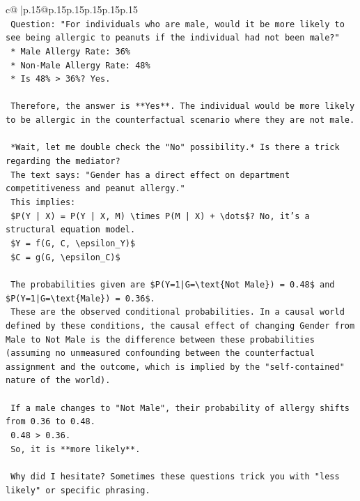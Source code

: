 \documentclass{article}
\begin{document}
{\begin{supertabular}{c@{$\;$}|p{.15\linewidth}@{}p{.15\linewidth}p{.15\linewidth}p{.15\linewidth}p{.15\linewidth}p{.15\linewidth}}
{{{\\ 
\texttt{    Question: "For individuals who are male, would it be more likely to see being allergic to peanuts if the individual had not been male?"} \\
\texttt{    *   Male Allergy Rate: 36\%} \\
\texttt{    *   Non{-}Male Allergy Rate: 48\%} \\
\texttt{    *   Is 48\% > 36\%? Yes.} \\
\\ 
\texttt{    Therefore, the answer is **Yes**. The individual would be more likely to be allergic in the counterfactual scenario where they are not male.} \\
\\ 
\texttt{    *Wait, let me double check the "No" possibility.* Is there a trick regarding the mediator?} \\
\texttt{    The text says: "Gender has a direct effect on department competitiveness and peanut allergy."} \\
\texttt{    This implies:} \\
\texttt{    \$P(Y | X) = P(Y | X, M) \textbackslash{}times P(M | X) + \textbackslash{}dots\$? No, it's a structural equation model.} \\
\texttt{    \$Y = f(G, C, \textbackslash{}epsilon\_Y)\$} \\
\texttt{    \$C = g(G, \textbackslash{}epsilon\_C)\$} \\
\\ 
\texttt{    The probabilities given are \$P(Y=1|G=\textbackslash{}text\{Not Male\}) = 0.48\$ and \$P(Y=1|G=\textbackslash{}text\{Male\}) = 0.36\$.} \\
\texttt{    These are the observed conditional probabilities. In a causal world defined by these conditions, the causal effect of changing Gender from Male to Not Male is the difference between these probabilities (assuming no unmeasured confounding between the counterfactual assignment and the outcome, which is implied by the "self{-}contained" nature of the world).} \\
\\ 
\texttt{    If a male changes to "Not Male", their probability of allergy shifts from 0.36 to 0.48.} \\
\texttt{    0.48 > 0.36.} \\
\texttt{    So, it is **more likely**.} \\
\\ 
\texttt{    Why did I hesitate? Sometimes these questions trick you with "less likely" or specific phrasing.} \\
}}}
\end{supertabular}}
\end{document}
